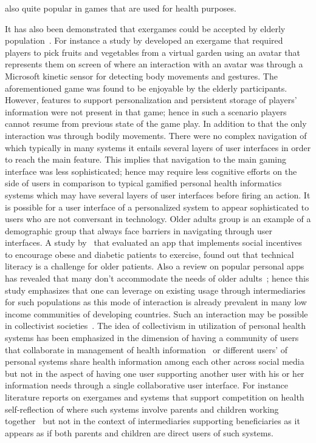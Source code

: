 also quite popular in games that are used for health purposes. 

It has also been demonstrated that exergames could be accepted by elderly population~\citep{brox2011exergames}. For instance a study by \cite{brauner2013increase} developed an exergame that required players to pick fruits and vegetables from a virtual garden using an avatar that represents them on screen of where an interaction with an avatar was through a Microsoft kinetic sensor for detecting body movements and gestures. The aforementioned game was found to be enjoyable by the elderly participants. However, features to support personalization and persistent storage of players' information were not present in that game; hence in such a scenario players cannot resume from previous state of the game play. In addition to that the only interaction was through bodily movements. There were no complex navigation of which typically in many systems it entails several layers of user interfaces in order to reach the main feature. This implies that navigation to the main gaming interface was less sophisticated; hence may require less cognitive efforts on the side of users in comparison to typical gamified personal health informatics systems which may have several layers of user interfaces before firing an action. It is possible for a user interface of a personalized system to appear sophisticated to users who are not conversant in technology. Older adults group is an example of a demographic group that always face barriers in navigating through user interfaces. A study by~\cite{chen2016social} that evaluated an app that implements social incentives to encourage obese and diabetic patients to exercise, found out that technical literacy is a challenge for older patients. Also a review on popular personal apps has revealed that many don't accommodate the needs of older adults~\citep{silva2014:smartphones}; hence this study emphasizes that one can leverage on existing usage through intermediaries for such populations as this mode of interaction is already prevalent in many low income communities of developing countries. Such an interaction may be possible in collectivist societies~\citep{parikh2006}. The idea of collectivism in utilization of personal health systems has been emphasized in the dimension of having a community of users that collaborate in management of health information~\citep{colineau2011motivating,grimes2009toward}  or different users' of personal systems share health information among each other across social media~\citep{ploderer2014social} but not in the aspect of having one user supporting another user with his or her information needs through a single collaborative user interface. For instance literature reports on exergames and systems that support competition on health self-reflection of where such systems involve  parents and children working together~\citep{grimes2009toward,saksono2015spaceship} but not in the context of intermediaries supporting beneficiaries as it appears as if both parents and children are direct users of such systems. 
